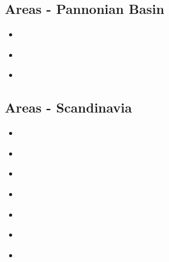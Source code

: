 \subsection{Areas - Pannonian Basin}

\begin{scriptsize}
\begin{itemize}
\item[\twothousandone]
\textcite{hupc01b} \\
\item[\twothousandtwo]
\textcite{hupc02} \\
\item[\twothousandtwentyone]
\textcite{kock21} \\
\end{itemize}
\end{scriptsize}

\subsection{Areas - Scandinavia}

\begin{scriptsize}
\begin{itemize}
\item[\nineteeneighty] 
\textcite{ramb80} \\
\item[\twothousandfive]
\textcite{stka05} \\
\item[\twothousandeight]
\textcite{stdm08} \\
\item[\twothousandthirteen]
\textcite{vabs13} \\
\item[\twothousandfourteen] 
\textcite{bovc14} \\
\item[\twothousandfifteen] 
\textcite{rovn15} \\
\item[\twothousand]
\textcite{rovb20} \\
\end{itemize}
\end{scriptsize}

